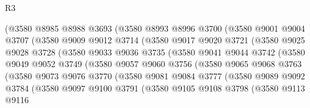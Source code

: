 \begin{lexlean}{R3}
\begin{coremodule}
                (@3580
                  @8985
                  @8988
                  @3693
                  (@3580
                    @8993
                    @8996
                    @3700
                    (@3580
                      @9001
                      @9004
                      @3707
                      (@3580
                        @9009
                        @9012
                        @3714
                        (@3580
                          @9017
                          @9020
                          @3721
                          (@3580
                            @9025
                            @9028
                            @3728
                            (@3580
                              @9033
                              @9036
                              @3735
                              (@3580
                                @9041
                                @9044
                                @3742
                                (@3580
                                  @9049
                                  @9052
                                  @3749
                                  (@3580
                                    @9057
                                    @9060
                                    @3756
                                    (@3580
                                      @9065
                                      @9068
                                      @3763
                                      (@3580
                                        @9073
                                        @9076
                                        @3770
                                        (@3580
                                          @9081
                                          @9084
                                          @3777
                                          (@3580
                                            @9089
                                            @9092
                                            @3784
                                            (@3580
                                              @9097
                                              @9100
                                              @3791
                                              (@3580
                                                @9105
                                                @9108
                                                @3798
                                                (@3580
                                                  @9113
                                                  @9116

\end{coremodule}
\end{lexlean}
